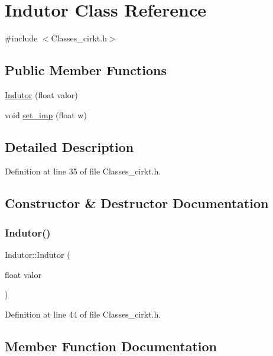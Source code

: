 \hypertarget{class_indutor}{}\section{Indutor Class Reference}
\label{class_indutor}


{\ttfamily \#include $<$Classes\+\_\+cirkt.\+h$>$}

\subsection*{Public Member Functions}
\begin{DoxyCompactItemize}
\item 
\mbox{\hyperlink{class_indutor_a0413c638b46aec5ef715866c3a1d48e2}{Indutor}} (float valor)
\item 
void \mbox{\hyperlink{class_indutor_a1ccb92d4515ed65b9a8b44942b9c71a3}{set\+\_\+imp}} (float w)
\end{DoxyCompactItemize}


\subsection{Detailed Description}


Definition at line 35 of file Classes\+\_\+cirkt.\+h.



\subsection{Constructor \& Destructor Documentation}
\mbox{\label{class_indutor_a0413c638b46aec5ef715866c3a1d48e2}} 
\subsubsection{\texorpdfstring{Indutor()}{Indutor()}}
{\footnotesize\ttfamily Indutor\+::\+Indutor (\begin{DoxyParamCaption}\item[{float}]{valor }\end{DoxyParamCaption})}



Definition at line 44 of file Classes\+\_\+cirkt.\+h.



\subsection{Member Function Documentation}
\mbox{\label{class_indutor_a1ccb92d4515ed65b9a8b44942b9c71a3}} 
